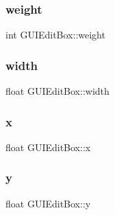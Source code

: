\subsubsection{\texorpdfstring{weight}{weight}}
{\footnotesize\ttfamily int G\+U\+I\+Edit\+Box\+::weight}

\hypertarget{class_g_u_i_edit_box_a0240eabe9d4208b824efc7cf76eda9ba}{}\label{class_g_u_i_edit_box_a0240eabe9d4208b824efc7cf76eda9ba} 
\subsubsection{\texorpdfstring{width}{width}}
{\footnotesize\ttfamily float G\+U\+I\+Edit\+Box\+::width}

\hypertarget{class_g_u_i_edit_box_a4f2d0e72d1032f6dbf47f96c6d6c7163}{}\label{class_g_u_i_edit_box_a4f2d0e72d1032f6dbf47f96c6d6c7163} 
\subsubsection{\texorpdfstring{x}{x}}
{\footnotesize\ttfamily float G\+U\+I\+Edit\+Box\+::x}

\hypertarget{class_g_u_i_edit_box_acc5eacd15038316e2642b814b229fadb}{}\label{class_g_u_i_edit_box_acc5eacd15038316e2642b814b229fadb} 
\subsubsection{\texorpdfstring{y}{y}}
{\footnotesize\ttfamily float G\+U\+I\+Edit\+Box\+::y}

